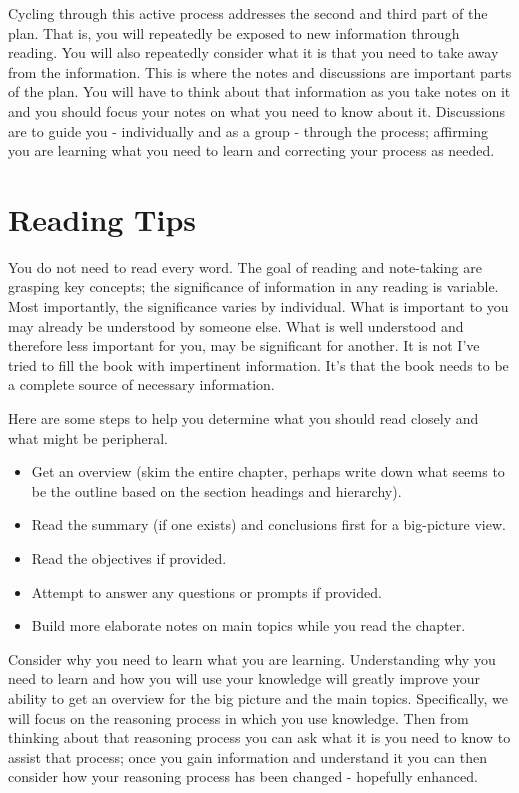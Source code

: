 Cycling through this active process addresses the second and third part of the plan. That is, you will repeatedly be exposed to new information through reading. You will also repeatedly consider what it is that you need to take away from the information. This is where the notes and discussions are important parts of the plan. You will have to think about that information as you take notes on it and you should focus your notes on what you need to know about it. Discussions are to guide you - individually and as a group - through the process; affirming you are learning what you need to learn and correcting your process as needed.

\section{Reading Tips}

You do not need to read every word. The goal of reading and note-taking are grasping key concepts; the significance of information in any reading is variable. Most importantly, the significance varies by individual. What is important to you may already be understood by someone else. What is well understood and therefore less important for you, may be significant for another. It is not I've tried to fill the book with impertinent information. It's that the book needs to be a complete source of necessary information. 

\begin{flushleft}
Here are some steps to help you determine what you should read closely and what might be peripheral.
\end{flushleft}

\begin{itemize}
\item{Get an overview (skim the entire chapter, perhaps write down what seems to be the outline based on the section headings and hierarchy).}
\item{Read the summary (if one exists) and conclusions first for a big-picture view.}
\item{Read the objectives if provided.}
\item{Attempt to answer any questions or prompts if provided.}
\item{Build more elaborate notes on main topics while you read the chapter.}
\end{itemize}

Consider why you need to learn what you are learning. Understanding why you need to learn and how you will use your knowledge will greatly improve your ability to get an overview for the big picture and the main topics. Specifically, we will focus on the reasoning process in which you use knowledge. Then from thinking about that reasoning process you can ask what it is you need to know to assist that process; once you gain information and understand it you can then consider how your reasoning process has been changed - hopefully enhanced.

